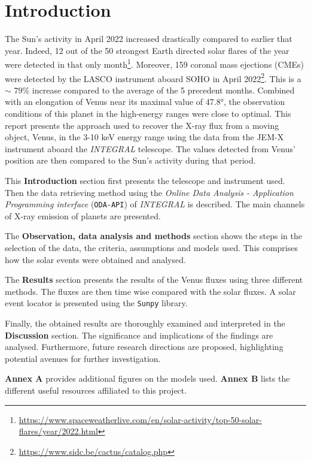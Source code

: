 \section{Introduction}
The Sun's activity in April 2022 increased drastically compared to earlier that year. Indeed, 12 out of the 50 strongest Earth directed solar flares of the year were detected in that only month\footnote{\url{https://www.spaceweatherlive.com/en/solar-activity/top-50-solar-flares/year/2022.html}}. Moreover, 159 coronal mass ejections (CMEs) were detected by the LASCO instrument aboard SOHO in April 2022\footnote{\url{https://www.sidc.be/cactus/catalog.php}}. This is a $\sim$ 79\% increase compared to the average of the 5 precedent months. Combined with an elongation of Venus near its maximal value of 47.8°, the observation conditions of this planet in the high-energy ranges were close to optimal. This report presents the approach used to recover the X-ray flux from a moving object, Venus, in the 3-10 keV energy range using the data from the JEM-X instrument aboard the \textit{INTEGRAL} telescope. The values detected from Venus' position are then compared to the Sun's activity during that period.

This \textbf{Introduction }section first presents the telescope and instrument used. Then the data retrieving method using the \textit{Online Data Analysis - Application Programming interface} (\texttt{ODA-API}) of \textit{INTEGRAL} is described. The main channels of X-ray emission of planets are presented.

The \textbf{Observation, data analysis and methods} section shows the steps in the selection of the data, the criteria, assumptions and models used. This comprises how the solar events were obtained and analysed.

The \textbf{Results} section presents the results of the Venus fluxes using three different methods. The fluxes are then time wise compared with the solar fluxes. A solar event locator is presented using the \texttt{Sunpy} library.

Finally, the obtained results are thoroughly examined and interpreted in the \textbf{Discussion} section. The significance and implications of the findings are analysed. Furthermore, future research directions are proposed, highlighting potential avenues for further investigation. 

\textbf{Annex A} provides additional figures on the models used. \textbf{Annex B} lists the different useful resources affiliated to this project.

